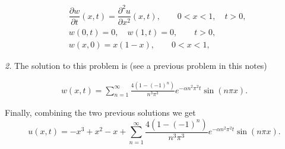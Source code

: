 \documentclass[11pt]{article}
\begin{document}
\begin{solution}
\begin{equation*} \begin{split}
& \dfrac{\partial w }{\partial t } (x,t) = \dfrac{\partial^2 u}{\partial x^2}(x,t), \qquad 0<x<1, \quad t>0, \\
& w(0,t) = 0, \quad w(1,t)= 0, \qquad t>0, \\
& w(x,0) = x(1-x), \qquad 0<x<1,
\end{split}\end{equation*}

\textsl{2. } The solution to this problem is (see a previous problem in this notes)

\begin{eqnarray*}
\boxed{w(x,t) = \sum_{n=1}^{\infty}\frac{4(1-(-1)^{n})}{n^{3}\pi^{3}}e^{-\alpha n^{2}\pi^{2}t}\sin (n\pi x)}.
\end{eqnarray*}

Finally, combining the two previous solutions we get
\[\boxed{u(x, t) = -x^{3} + x^{2} - x + \sum_{n=1}^{\infty}\frac{4(1-(-1)^{n})}{n^{3}\pi^{3}}e^{-\alpha n^{2}\pi^{2}t}\sin (n\pi x)}.\]
\end{solution}
\end{document}
